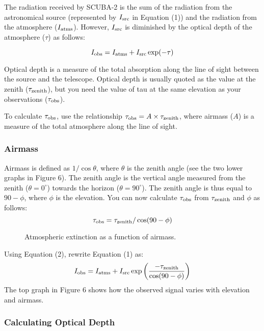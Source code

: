 \documentclass[twoside,11pt]{article}
\renewcommand{\_}{\texttt{\symbol{95}}}
\begin{document}
The radiation received by SCUBA-2 is the sum of the radiation from the
astronomical source (represented by $I_{\rm src}$ in Equation (1)) and
the radiation from the atmosphere ($I_{\rm atms}$). However, $I_{\rm
    src}$ is diminished by the optical depth of the atmosphere
  ($\tau$) as follows:

\begin{equation}
I_{\rm obs} = I_{\rm atms} + I_{\rm src} \exp(-\tau)
\end{equation}

Optical depth is a measure of the total absorption along the line of
sight between the source and the telescope. Optical depth is usually
quoted as the value at the zenith ($\tau_{\rm zenith}$), but you need
the value of tau at the same elevation as your observations
($\tau_{\rm obs}$).

To calculate $\tau_{\rm obs}$, use the relationship $\tau_{\rm obs} =
A \times \tau_{\rm zenith}$, where airmass ($A$) is a measure of the
total atmosphere along the line of sight.

\subsubsection{Airmass}

Airmass is defined as $1 / \cos \theta$, where $\theta$ is the zenith
angle (see the two lower graphs in Figure 6). The zenith angle is the
vertical angle measured from the zenith ($\theta = 0^\circ$) towards
the horizon ($\theta = 90^\circ$). The zenith angle is thus equal to
$90-\phi$, where $\phi$ is the elevation. You can now calculate
$\tau_{\rm obs}$ from $\tau_{\rm zenith}$ and $\phi$ as follows:
\begin{equation}
\tau_{\rm obs} = \tau_{\rm zenith} / \cos(90 - \phi )
\end{equation}

\begin{figure}
\caption{Atmospheric extinction as a function of airmass.}
\end{figure}

Using Equation (2), rewrite Equation (1) as:
\begin{equation}
I_{\rm obs} = I_{\rm atms} + I_{\rm src} \exp \left( 
\frac{-\tau_{\rm zenith}}{\cos(90-\phi)}\right)
\end{equation}
The top graph in Figure 6 shows how the observed signal varies with elevation
and airmass.

\subsubsection{Calculating Optical Depth}
\end{document}
